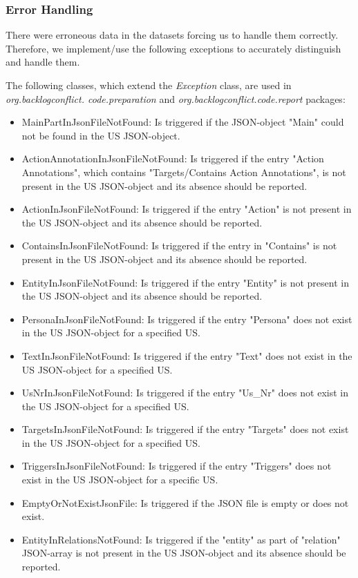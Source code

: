 \subsubsection*{Error Handling}
There were erroneous data in the datasets forcing us to handle them correctly. Therefore, we implement/use the following exceptions to accurately distinguish and handle them.

The following classes, which extend the \textit{Exception} class, are used in \textit{org.backlogconflict. code.preparation} and \textit{org.backlogconflict.code.report} packages:
\begin{itemize}
	\item MainPartInJsonFileNotFound: Is triggered if the JSON-object "Main" could not be found in the US JSON-object.
	
	\item ActionAnnotationInJsonFileNotFound: Is triggered if the entry "Action Annotations", which contains "Targets/Contains Action Annotations", is not present in the US JSON-object and its absence should be reported.
	
	\item ActionInJsonFileNotFound: Is triggered if the entry "Action" is not present in the US JSON-object and its absence should be reported.
		
	\item ContainsInJsonFileNotFound: Is triggered if the entry in "Contains" is not present in the US JSON-object and its absence should be reported.
	
	\item EntityInJsonFileNotFound: Is triggered if the entry "Entity" is not present in the US JSON-object and its absence should be reported.
	
	\item PersonaInJsonFileNotFound: Is triggered if the entry "Persona" does not exist in the US JSON-object for a specified US.
	
	\item TextInJsonFileNotFound: Is triggered if the entry "Text" does not exist in the US JSON-object for a specified US. 
	
	\item UsNrInJsonFileNotFound: Is triggered if the entry "Us\_Nr" does not exist in the US JSON-object for a specified US.
	
	\item TargetsInJsonFileNotFound: Is triggered if the entry "Targets" does not exist in the US JSON-object for a specified US.
	
	\item TriggersInJsonFileNotFound: Is triggered if the entry "Triggers" does not exist in the US JSON-object for a specific US.
	
	\item EmptyOrNotExistJsonFile: Is triggered if the JSON file is empty or does not exist.
	
	\item EntityInRelationsNotFound: Is triggered if the "entity" as part of "relation" JSON-array is not present in the US JSON-object and its absence should be reported.
	
\end{itemize}

